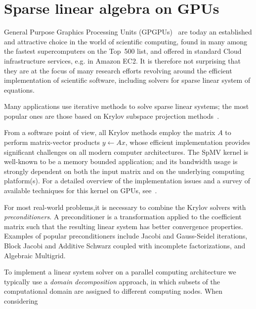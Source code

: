  \section{Sparse linear algebra on GPUs}

General Purpose Graphics Processing Units (GPGPUs)~\cite{Luebke06}  
are today an established and attractive choice in the world of
scientific computing, found in many among the fastest supercomputers
on the Top~500 list, and offered in standard Cloud infrastructure
services, e.g. in  Amazon EC2. It is therefore not surprising that
they are at the focus of many research efforts revolving around the
efficient implementation of scientific software, including solvers for
sparse linear system of equations. 

Many applications use iterative methods to solve sparse linear
systems;  the most popular ones are those based on  Krylov subspace 
projection methods~\cite{MR1990645}. 

From a  software point of view, all Krylov methods employ the matrix $A$ 
to perform matrix-vector products  $y\gets Ax$, whose efficient
implementation provides significant challenges on all modern computer
architectures. 
The SpMV kernel is well-known to be a memory bounded application;
and  its bandwidth usage  is strongly dependent on both the input
matrix and on the underlying computing platform(s). For a detailed
overview of the implementation issues and a survey of available
techniques for this kernel on GPUs,
see~\cite{Filippone:2017:SMM:3034774.3017994}.   

For most real-world problems,it is necessary to combine the Krylov
solvers with  \emph{preconditioners}. A preconditioner is a
transformation applied to the coefficient  matrix such that the
resulting linear system has better convergence properties. Examples of
popular preconditioners include Jacobi and Gauss-Seidel iterations,
Block Jacobi and Additive Schwarz coupled with incomplete
factorizations,  and Algebraic Multigrid. 

To implement a linear system solver on a parallel computing
architecture we typically use a \emph{domain decomposition} approach,
in which subsets of the computational domain are assigned to different
computing nodes. When considering 


